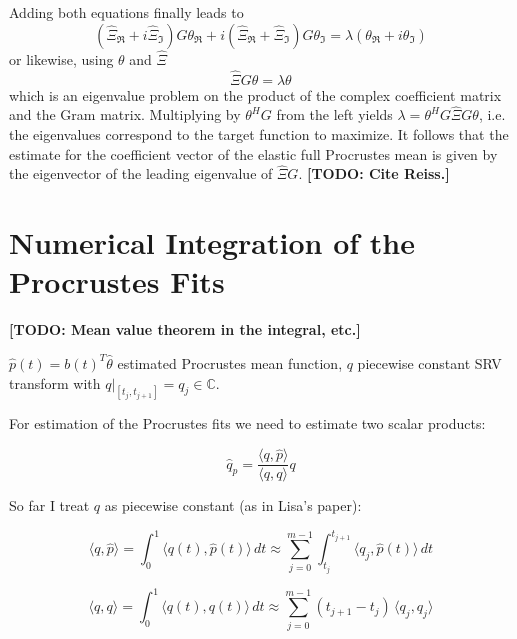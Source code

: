 Adding both equations finally leads to  
$$( \hat\Xi_\Re + i \hat\Xi_\Im) G \theta_\Re + i (\hat\Xi_\Re + \hat\Xi_\Im) G \theta_\Im = \lambda ( \theta_\Re + i \theta_\Im)$$
or likewise, using $\theta$ and $\hat\Xi$
$$ \hat\Xi G \theta = \lambda \theta $$
which is an eigenvalue problem on the product of the complex coefficient matrix and the Gram matrix.
Multiplying by $\theta^H G$ from the left yields $\lambda = \theta^H G \hat\Xi G \theta$, i.e. the eigenvalues correspond to the target function to maximize.
It follows that the estimate for the coefficient vector of the elastic full Procrustes mean is given by the eigenvector of the leading eigenvalue of $\hat\Xi G$.
\textbf{[TODO: Cite Reiss.]}



\section{Numerical Integration of the Procrustes Fits}
\label{sec:3-pfits}
\textbf{[TODO: Mean value theorem in the integral, etc.]}

$\hat{p}(t) = b(t)^T \hat{\theta}$ estimated Procrustes mean function, $q$ piecewise constant SRV transform with $q|_{[t_j, t_{j+1}]} = q_j \in \mathbb{C}$.

For estimation of the Procrustes fits we need to estimate two scalar products:

$$ \hat{q}_{p} = \frac{\langle q,\hat{p} \rangle}{\langle q, q \rangle} q $$

So far I treat $q$ as piecewise constant (as in Lisa's paper):

$$ \langle q, \hat{p} \rangle = \int_0^1 \langle q(t), \hat{p}(t) \rangle \, dt \approx \sum_{j=0}^{m-1} \int_{t_j}^{t_{j+1}} \langle q_j, \hat{p}(t) \rangle \, dt $$

$$ \langle q, q \rangle = \int_0^1 \langle q(t), q(t) \rangle \, dt \approx \sum_{j=0}^{m-1} (t_{j+1} - t_j) \, \langle q_j, q_j \rangle $$

